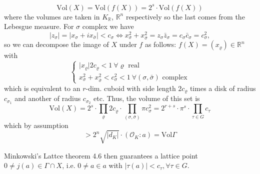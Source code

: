 \[
\text{Vol}(X) = \text{Vol}(f(X))= 2^s \cdot \text{Vol}(f(X))
\]
where the volumes are taken in \(K_\mathbb{R}\), \(\mathbb{R}^n\) respectively so the last comes from the Lebesgue measure.
For \(\sigma\) complex we have
\[
\vert z_\sigma \vert = \vert x_\sigma + ix_{\bar{\sigma}} \vert < c_\sigma \iff x_\sigma^2 + x_{\bar{\sigma}}^2 = z_\sigma \bar{z}_\sigma = c_\sigma \bar{c}_\sigma = c_\sigma^2,
\]
so we can decompose the image of \(X\) under \(f\) as follows:
\(f(X) = (x_\varrho) \in \mathbb{R}^n\)
with
\[
\begin{cases}
    \vert x_\varrho \vert{2c_\varrho} < 1 \ \forall \varrho \text{ real} \\
    x_\sigma^2 + x_{\bar{\sigma}}^2 < c_\sigma^2 < 1 \ \forall (\sigma, \bar{\sigma}) \text{ complex}
\end{cases}
\]
which is equivalent to an \(r\)-dim. cuboid with side length \( 2c_\varrho \) times a disk of radius \( c_{\sigma_1} \) and another of radius \( c_{\sigma_2} \) etc.
Thus, the volume of this set is
\[
\text{Vol}(X) = 2^s \cdot \prod_\varrho 2c_\varrho \cdot \prod_{(\sigma, \bar{\sigma})} \pi c_\sigma^2 = 2^{r+s} \cdot \pi^s \cdot \prod_{\tau \in G} c_\tau
\]
which by assumption
\[
> 2^n \sqrt{\vert d_K \vert} \cdot ( \mathcal{O}_K : a ) = \text{Vol} \Gamma
\]

Minkowski's Lattce theorem 4.6 then guarantees a lattice point \(0 \neq j(a) \in \Gamma \cap X\), i.e. \(0 \neq a \in a\) with 
\(\vert \tau(a) \vert < c_\tau, \forall \tau \in G\).
